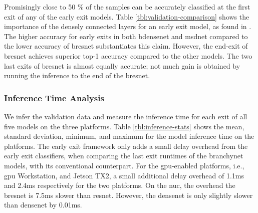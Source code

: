 Promisingly close to 50 \% of the samples can be accurately classified at the first exit of any of the early exit models. Table \ref{tbl:validation-comparison} shows the importance of the densely connected layers for an early exit model, as found in \cite{huang_multi-scale_2017}.  The higher accuracy for early exits in both \gls{bdensenet} and \gls{msdnet} compared to the lower accuracy of \gls{bresnet} substantiates this claim. However, the end-exit of \gls{bresnet} achieves superior top-1 accuracy compared to the other models. The two last exits of \gls{bresnet} is almost equally accurate; not much gain is obtained by running the inference to the end of the \gls{bresnet}. 
 
\subsubsection{Inference Time Analysis}

We infer the validation data and measure the inference time for each exit of all five models on the three platforms. Table \ref{tbl:inference-stats} shows the mean, standard deviation, minimum, and maximum for the model inference time on the platforms. The early exit framework only adds a small delay overhead from the early exit classifiers, when comparing the last exit runtimes of the \gls{branchynet} models, with its conventional counterpart. For the \gls{gpu}-enabled platforms, i.e., \gls{gpu} Workstation, and Jetson TX2, a small additional delay overhead of 1.1ms and 2.4ms respectively for the two platforms. On the \gls{nuc}, the overhead the \gls{bresnet} is  7.5ms slower than \gls{resnet}. However, the \gls{densenet} is only slightly slower than \gls{densenet} by 0.01ms.   

